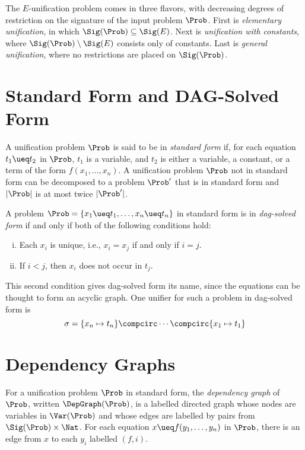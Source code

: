 The $E$-unification problem comes in three flavors, with decreasing degrees of
restriction on the signature of the input problem $\Prob$. First is
\emph{elementary unification}, in which $\Sig(\Prob) \subseteq \Sig(E)$. Next
is \emph{unification with constants}, where $\Sig(\Prob) \setminus \Sig(E)$
consists only of constants. Last is \emph{general unification}, where no
restrictions are placed on $\Sig(\Prob)$.

\section{Standard Form and DAG-Solved Form}\label{sec:std-form}

A unification problem $\Prob$ is said to be in \emph{standard form} if, for
each equation $t_1 \ueq t_2$ in $\Prob$, $t_1$ is a variable, and $t_2$ is
either a variable, a constant, or a term of the form $f(x_1, \dotsc, x_n)$. A
unification problem $\Prob$ not in standard form can be decomposed to a problem
$\Prob'$ that is in standard form and $|\Prob|$ is at most twice $|\Prob'|$.

A problem $\Prob = \{ x_1 \ueq t_1, \dotsc, x_n \ueq t_n \}$ in standard form
is in \emph{dag-solved form} if and only if both of the following conditions
hold:

\begin{enumerate}[(i)]
    \item Each $x_i$ is unique, i.e., $x_i = x_j$ if and only if $i = j$.
    \item If $i < j$, then $x_i$ does not occur in $t_j$.
\end{enumerate}

This second condition gives dag-solved form its name, since the equations can
be thought to form an acyclic graph. One unifier for such a problem in
dag-solved form is
\[\sigma = \{ x_n \mapsto t_n \} \compcirc \dotsb \compcirc \{ x_1 \mapsto t_1 \}\]

\section{Dependency Graphs}\label{sec:dep-graphs}

For a unification problem $\Prob$ in standard form, the \emph{dependency graph}
of $\Prob$, written $\DepGraph(\Prob)$, is a labelled directed graph whose
nodes are variables in $\Var(\Prob)$ and whose edges are labelled by pairs from
$\Sig(\Prob) \times \Nat$.  For each equation $x \ueq f(y_1, \dotsc, y_n)$ in
$\Prob$, there is an edge from $x$ to each $y_i$ labelled $(f, i)$.

